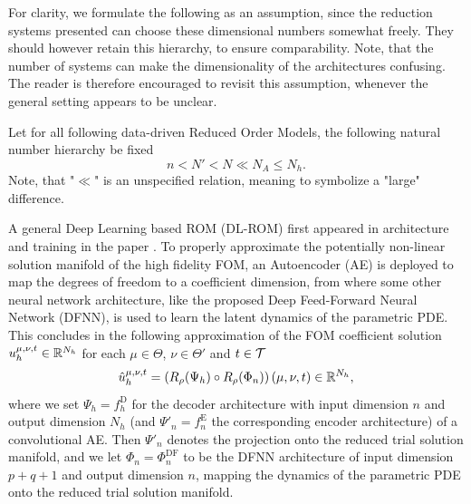 For clarity, we formulate the following as an assumption, since the reduction systems presented
can choose these dimensional numbers somewhat freely. They should however retain this hierarchy, to ensure comparability.
Note, that the number of systems can make the dimensionality of the architectures confusing.
The reader is therefore encouraged to revisit this assumption, whenever
the general setting appears to be unclear.

\begin{assumption} \label{assumption: dimension hierarchy}
    Let for all following data-driven Reduced Order Models, the following natural number hierarchy be fixed
    \begin{equation*}
        n < N' < N \ll N_A \leq N_h.
    \end{equation*}
    Note, that "$\ll$" is an unspecified relation, meaning to symbolize a "large" difference.
\end{assumption}

A general Deep Learning based ROM (DL-ROM) first appeared in architecture and 
training in the paper \cite{fresca2020}. To properly approximate the potentially 
non-linear solution manifold of the high fidelity FOM, an Autoencoder (AE) is deployed to map the degrees of freedom 
to a coefficient dimension, 
from where some other neural network architecture, 
like the proposed Deep Feed-Forward Neural Network (DFNN), is used to learn the latent dynamics of the parametric PDE.
This concludes in the following approximation of the FOM coefficient solution $u_h^{\mu, \nu, t} \in \mathbb{R}^{N_h}$ for each 
$\mu \in \Theta$, $\nu \in \Theta'$ and $t \in \mathcal{T}$
\begin{equation} \label{eq: dl rom solution}
    \hat{u}_h^{\mu, \nu, t} = \left(R_\rho(\Psi_h) \circ R_\rho(\Phi_n)\right) (\mu, \nu, t) \in \mathbb{R}^{N_h},
\end{equation}
where we set $\Psi_h = f^\text{D}_h$ for the decoder architecture with input dimension $n$ and output dimension $N_h$
(and $\Psi'_n = f^\text{E}_n$ the corresponding encoder architecture) of a convolutional AE. 
Then $\Psi'_n$ denotes the projection onto the reduced trial solution manifold, and we 
let $\Phi_n = \Phi_n^\text{DF}$  
to be the DFNN architecture of input dimension $p + q + 1$ and output dimension $n$, 
mapping the dynamics of the parametric PDE onto the reduced trial solution manifold.

